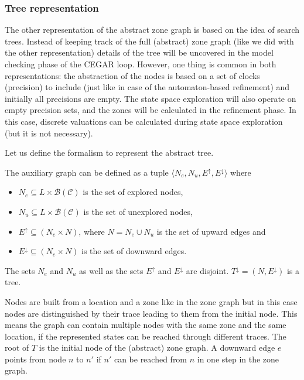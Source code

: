 

 

\subsubsection{Tree representation}
The other representation of the abstract zone graph is based on the idea of search trees. Instead of keeping track of the full (abstract) zone graph (like we did with the other representation) details of the tree will be uncovered in the model checking phase of the CEGAR loop. However, one thing is common in both representations:  the abstraction of the nodes is based on a set of clocks (precision) to include (just like in case of the automaton-based refinement) and initially all precisions are empty. The state space exploration will also operate on empty precision sets, and the zones will be calculated in the refinement phase. In this case, discrete valuations can be calculated during state space exploration (but it is not necessary).

Let us define the formalism to represent the abstract tree.

\begin{dfn}
	The auxiliary graph can be defined as a tuple $\langle N_e, N_u, E^\uparrow, E^\downarrow \rangle$ where
	\begin{itemize}
		\item $N_e \subseteq L \times \mathcal{B}(\mathcal{C})$ is the set of explored nodes,
		\item $N_u \subseteq L \times \mathcal{B}(\mathcal{C})$  is the set of unexplored nodes,
		\item $E^\uparrow \subseteq (N_e \times N)$, where $N = N_e \cup N_u$ is the set of upward edges and
		\item $E^\downarrow \subseteq (N_e \times N)$  is the set of downward edges.
	\end{itemize}
	 The sets $N_e$ and $N_u$ as well as the sets $E^\uparrow$ and $E^\downarrow$ are disjoint. $T^\downarrow=(N,E^\downarrow)$ is a tree.
\end{dfn}
 
Nodes are built from a location and a zone like in the zone graph but in this case nodes are distinguished by their trace leading to them from the initial node. This means the graph can contain multiple nodes with the same zone and the same location, if the represented states can be reached through different traces. The root of $T$ is the initial node of the (abstract) zone graph. A downward edge $e$ points from node $n$ to $n'$ if $n'$ can be reached from $n$ in one step in the zone graph. %

